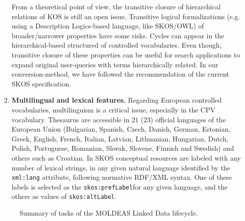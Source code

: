\begin{enumerate}
 From a theoretical point of view, the transitive closure of hierarchical relations 
 of KOS is still an open issue. Transitive logical formalizations (e.g. using a Description Logics-based language, like SKOS/OWL) 
 of broader/narrower properties have some risks. Cycles can appear in the hierarchical-based structured 
 of controlled vocabularies. Even though, transitive closure of these properties can be useful for 
 search applications to expand original user-queries with terms hierarchically related. In our conversion-method, 
 we have followed the recommendation of the current SKOS specification.
 
 \item \textbf{Multilingual and lexical features.} Regarding European controlled vocabularies, 
 multilinguism is a critical issue, especially in the CPV vocabulary. 
 Thesaurus are accessible in $21$ ($23$) official languages of the European Union 
 (Bulgarian, Spanish, Czech, Danish, German, Estonian, Greek, English, French, Italian, Latvian, Lithuanian, 
 Hungarian, Dutch, Polish, Portuguese, Romanian, Slovak, Slovene, Finnish and Swedish) and others such as Croatian. 
 In SKOS conceptual resources are labeled with any number of lexical strings, in any given natural 
 language identified by the \texttt{xml:lang} attribute, following normative RDF/XML syntax. 
 One of these labels is selected as the \texttt{skos:prefLabel}for any given language, and the 
 others as values of \texttt{skos:altLabel}.
 
\end{enumerate}


\begin{figure}[ht]
\centering
 \caption{Summary of tasks of the MOLDEAS Linked Data lifecycle.}
 \label{fig:summary-tasks}
\end{figure}


% 

